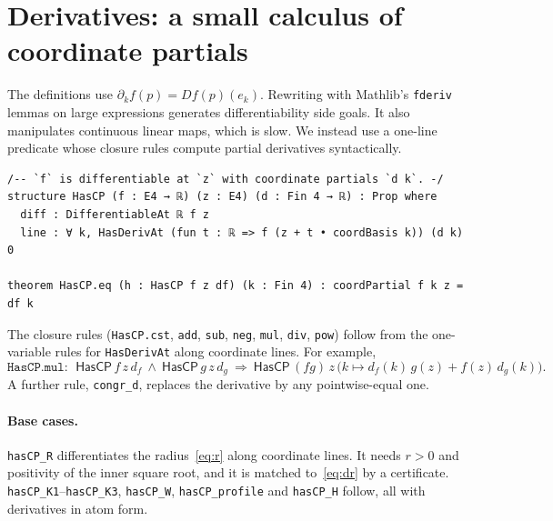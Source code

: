 \documentclass[11pt]{article}
\theoremstyle{definition}
\theoremstyle{remark}
\newcommand{\lean}[1]{\lstinline[basicstyle=\ttfamily\normalsize,columns=fullflexible,breaklines=false]{#1}}
\begin{document}
\section{Derivatives: a small calculus of coordinate partials}\label{sec:hascp}

The definitions use $\partial_k f(p)=Df(p)(e_k)$.
Rewriting with Mathlib's \lean{fderiv} lemmas on large expressions generates differentiability side goals.
It also manipulates continuous linear maps, which is slow.
We instead use a one-line predicate whose closure rules compute partial derivatives syntactically.

\begin{lstlisting}
/-- `f` is differentiable at `z` with coordinate partials `d k`. -/
structure HasCP (f : E4 → ℝ) (z : E4) (d : Fin 4 → ℝ) : Prop where
  diff : DifferentiableAt ℝ f z
  line : ∀ k, HasDerivAt (fun t : ℝ => f (z + t • coordBasis k)) (d k) 0

theorem HasCP.eq (h : HasCP f z df) (k : Fin 4) : coordPartial f k z = df k
\end{lstlisting}
\noindent The closure rules (\lean{HasCP.cst}, \lean{add}, \lean{sub}, \lean{neg}, \lean{mul}, \lean{div}, \lean{pow}) follow from the one-variable rules for \lean{HasDerivAt} along coordinate lines.
For example,
\[
  \texttt{HasCP.mul}:\ \ \mathsf{HasCP}\,f\,z\,d_f\ \wedge\ \mathsf{HasCP}\,g\,z\,d_g\ \Longrightarrow\ \mathsf{HasCP}\,(fg)\,z\,\big(k\mapsto d_f(k)\,g(z)+f(z)\,d_g(k)\big).
\]
A further rule, \lean{congr_d}, replaces the derivative by any pointwise-equal one.

\paragraph{Base cases.}
\lean{hasCP_R} differentiates the radius~\eqref{eq:r} along coordinate lines.
It needs $r>0$ and positivity of the inner square root, and it is matched to~\eqref{eq:dr} by a certificate.
\lean{hasCP_K1}--\lean{hasCP_K3}, \lean{hasCP_W}, \lean{hasCP_profile} and \lean{hasCP_H} follow, all with derivatives in atom form.
\end{document}
